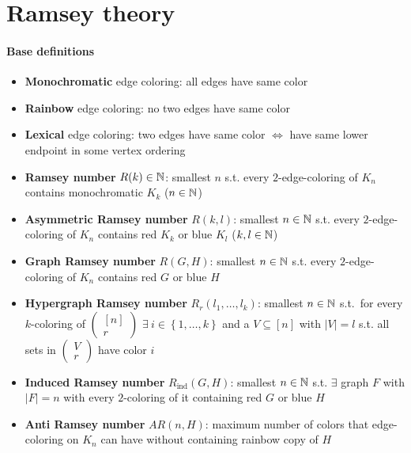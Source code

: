 \section{Ramsey theory}

\paragraph{Base definitions}
\begin{itemize}
  \item \textbf{Monochromatic} edge coloring: all edges have same color
  \item \textbf{Rainbow} edge coloring: no two edges have same color
  \item \textbf{Lexical} edge coloring: two edges have same color \( \Leftrightarrow \) have same lower endpoint in some vertex ordering
  \item \textbf{Ramsey number} \( R(k) \in \mathbb{N} \): smallest \( n \) s.t. every \( 2 \)-edge-coloring of \( K_n \) contains monochromatic \( K_k \) (\( n \in \mathbb{N} \))
  \item \textbf{Asymmetric Ramsey number} \( R(k,l) \): smallest \( n \in \mathbb{N} \) s.t. every \( 2 \)-edge-coloring of \( K_n \) contains red \( K_k \) or blue \( K_l \) (\( k,l \in \mathbb{N} \))
  \item \textbf{Graph Ramsey number} \( R(G,H) \): smallest \( n \in \mathbb{N} \) s.t. every \( 2 \)-edge-coloring of \( K_n \) contains red \( G \) or blue \( H \)
  \item \textbf{Hypergraph Ramsey number} \( R_r(l_1, \dots, l_k) \): smallest \( n \in \mathbb{N} \) s.t.\ for every \( k \)-coloring of \( \left( \begin{smallmatrix}
    [n] \\ r
  \end{smallmatrix} \right) \) \( \exists \ i  \in \left \{ 1, \dots, k \right \} \) and a \( V \subseteq [n] \) with \( \left\vert V \right\vert = l \) s.t. all sets in \( \left( \begin{smallmatrix}
    V \\ r
  \end{smallmatrix} \right) \) have color \( i \)
  \item \textbf{Induced Ramsey number} \( R_{\text{ind}}(G,H) \): smallest \( n \in \mathbb{N} \) s.t. \( \exists \) graph \( F \) with \( \left\vert F \right\vert = n \) with every \( 2 \)-coloring of it containing red \( G \) or blue \( H \)
  \item \textbf{Anti Ramsey number} \( AR(n,H) \): maximum number of colors that edge-coloring on \( K_n \) can have without containing rainbow copy of \( H \)

\end{itemize}
